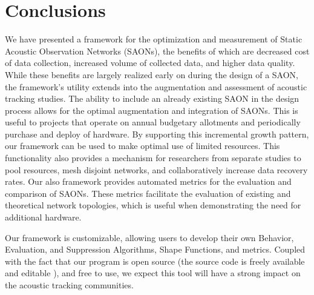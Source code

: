 \chapter{Conclusions}
We have presented a framework for the optimization and measurement of Static Acoustic Observation Networks (SAONs), the benefits of which are decreased cost of data collection, increased volume of collected data, and higher data quality.  While these benefits are largely realized early on during the design of a SAON, the framework's utility extends into the augmentation and assessment of acoustic tracking studies.  The ability to include an already existing SAON in the design process allows for the optimal augmentation and integration of SAONs.  This is useful to projects that operate on annual budgetary allotments and periodically purchase and deploy of hardware.  By supporting this incremental growth pattern, our framework can be used to make optimal use of limited resources.  This functionality also provides a mechanism for researchers from separate studies to pool resources, mesh disjoint networks, and collaboratively increase data recovery rates.  Our also framework provides automated metrics for the evaluation and comparison of SAONs.  These metrics facilitate the evaluation of existing and theoretical network topologies, which is useful when demonstrating the need for additional hardware.

Our framework is customizable, allowing users to develop their own Behavior, Evaluation, and Suppression Algorithms, Shape Functions, and metrics.  Coupled with the fact that our program is open source (the source code is freely available and editable \cite{acousitcdeploy}), and free to use, we expect this tool will have a strong impact on the acoustic tracking communities.  
